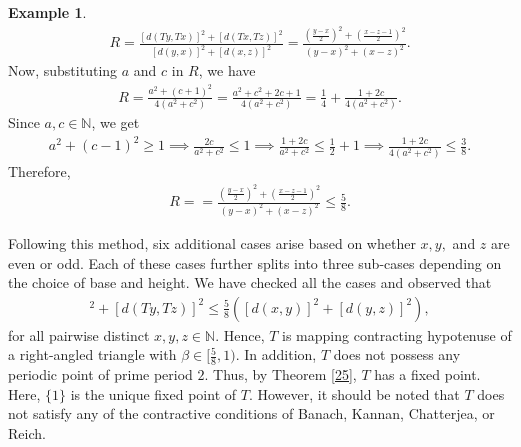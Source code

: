 \documentclass[11pt,reqno,a4paper]{amsart}
\theoremstyle{plain}
\theoremstyle{definition}
\newtheorem{example}[theorem]{Example}
\theoremstyle{remark}
\numberwithin{equation}{section}
\begin{document}
\begin{example}
\begin{align*}
    R=\frac{[d(Ty,Tx)]^2 +[d(Tx,Tz)]^2}{[d(y,x)]^2 +[d(x,z)]^2}
     =\frac{(\frac{y-x}{2})^2 +(\frac{x-z-1}{2})^2}{(y-x)^2 +(x-z)^2}.
\end{align*}
Now, substituting $a$ and $c$ in $R$, we have
\begin{align*}
    R= \frac{a^2 + (c+1)^2}{4(a^2 + c^2)}
     =\frac{a^2 + c^2 + 2c + 1}{4(a^2 + c^2)}
     = \frac{1}{4} + \frac{1 + 2c}{4(a^2 + c^2)}.
\end{align*}
Since $a,c \in \mathbb{N}$, we get
\begin{align*}
    a^2 + (c-1)^2 \ge 1
    \implies \frac{2c}{a^2 + c^2} \le 1
    \implies \frac{1 + 2c}{a^2 + c^2} \le \frac{1}{2} + 1
    \implies \frac{1 + 2c}{4(a^2 + c^2)} \le \frac{3}{8}.
\end{align*}
Therefore, 
\begin{align}\label{2823}
   R= =\frac{(\frac{y-x}{2})^2 +(\frac{x-z-1}{2})^2}{(y-x)^2 +(x-z)^2} \le \frac{5}{8}. 
\end{align}

Following this method, six additional cases arise based on whether $x, y,$ and $z$ are even or odd. Each of these cases further splits into three sub-cases depending on the choice of base and height. We have checked all the cases and observed that 
\begin{align*}
    [d(Tx,Ty)]^2+[d(Ty,Tz)]^2\le \frac{5}{8} ([d(x,y)]^2+[d(y,z)]^2),
\end{align*}
for all pairwise distinct $x,y,z \in \mathbb{N}$. Hence, $T$ is mapping contracting hypotenuse of a right-angled triangle with $\beta \in [\frac{5}{8},1)$. In addition, $T$ does not possess any periodic point of prime period $2$. Thus, by Theorem \ref{25}, $T$ has a fixed point. Here, $\{1\}$ is the unique fixed point of $T$. However, it should be noted that $T$ does not satisfy any of the contractive conditions of Banach, Kannan, Chatterjea, or Reich.



\end{example}
\end{document}
